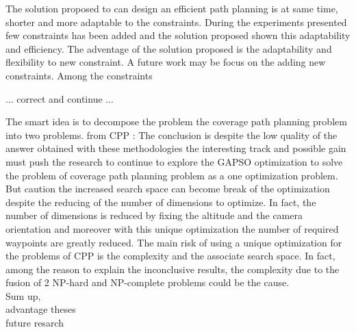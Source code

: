 The solution proposed to can design an efficient path planning is at same time, shorter and more adaptable to the constraints. During the experiments presented few constraints has been added and the solution proposed shown this adaptability and efficiency. 
The adventage of the solution proposed is the adaptability and flexibility to new constraint.  A future work  may be focus on the adding new constraints. Among the constraints 

... correct and continue ...

 
 The smart idea is to decompose the problem the coverage path planning problem into two problems. 
 from CPP : 
 The conclusion is despite the low quality of the answer obtained with these methodologies the interesting track and possible gain must push the research to continue to explore the GAPSO optimization to solve the problem of coverage path planning problem as a one optimization problem. But caution the increased search space can become break of the optimization despite the reducing of the number of dimensions to optimize. In fact, the number of dimensions is reduced by fixing the altitude and the camera orientation and moreover with this unique optimization the number of required waypoints are greatly reduced. 
The main risk of using a unique optimization for the problems of CPP is the complexity and the associate search space. In fact, among the reason to explain the inconclusive results, the complexity due to the fusion of 2 NP-hard and NP-complete problems could be the cause. \\
		
		
		Sum up,\\ 
		advantage theses\\
		future resarch